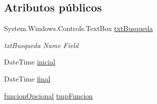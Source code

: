 \subsection*{Atributos públicos}
\begin{DoxyCompactItemize}
\item 
System.\-Windows.\-Controls.\-Text\-Box \hyperlink{class_proyecto___integrador__3_1_1_reportes_1_1_reporte_por_unidad_a0a6db8ee110ce078b4507f464c026fda}{txt\-Busqueda}
\begin{DoxyCompactList}\small\item\em txt\-Busqueda Name Field \end{DoxyCompactList}\item 
Date\-Time \hyperlink{class_proyecto___integrador__3_1_1_reportes_1_1_reporte_por_unidad_a580b30fc38c300431b3827dd370c794b}{inicial}
\item 
Date\-Time \hyperlink{class_proyecto___integrador__3_1_1_reportes_1_1_reporte_por_unidad_a1f1ef326bff361e8fad3182f10c5da2f}{final}
\item 
\hyperlink{class_proyecto___integrador__3_1_1_reportes_1_1_reporte_por_unidad_ac892258dc32e6a09c7acac315291ea09}{funcion\-Opcional} \hyperlink{class_proyecto___integrador__3_1_1_reportes_1_1_reporte_por_unidad_a2f638ddb1de1e8a845093312f55b07db}{tmp\-Funcion}
\end{DoxyCompactItemize}
